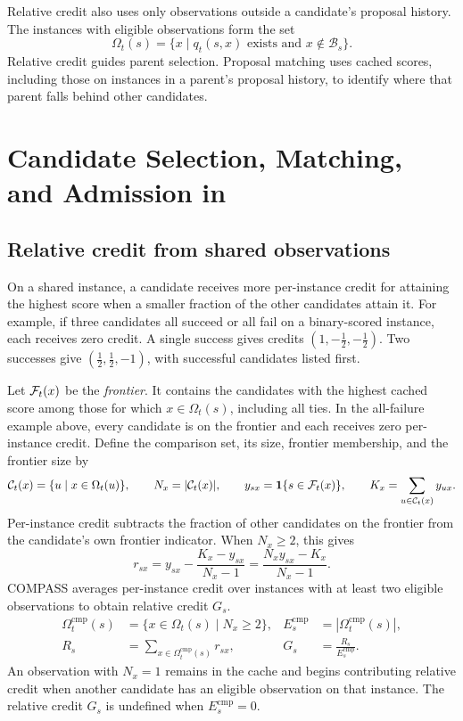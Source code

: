 Relative credit also uses only observations outside a candidate's proposal
history.  The instances with eligible observations form the set
\[
\Omega_t(s)=\{x\mid q_t(s,x)\text{ exists and }x\notin\mathcal B_s\}.
\]
Relative credit guides parent selection.  Proposal matching uses cached scores,
including those on instances in a parent's proposal history, to identify where
that parent falls behind other candidates.

\newpage
\section{Candidate Selection, Matching, and Admission in \method{}}
\label{sec:method}

\subsection{Relative credit from shared observations}
\label{sec:global_credit}

On a shared instance, a candidate receives more per-instance credit for attaining
the highest score when a smaller fraction of the other candidates attain it.
For example, if three candidates all succeed or all fail on a binary-scored
instance, each receives zero credit.  A single success gives credits
$(1,-\tfrac12,-\tfrac12)$. Two successes give
$(\tfrac12,\tfrac12,-1)$, with successful candidates listed first.

Let $\mathcal{F}_t(x)$ be the \emph{frontier}.  It contains the candidates with the
highest cached score among those for which $x\in\Omega_t(s)$, including all
ties.
In the all-failure example above, every candidate is on the frontier and each
receives zero per-instance credit.  Define the comparison set, its size,
frontier membership, and the frontier size by
\[
\mathcal C_t(x)=\{u\mid x\in\Omega_t(u)\},\qquad
N_x=|\mathcal C_t(x)|,\qquad
y_{sx}=\mathbf{1}\{s\in\mathcal{F}_t(x)\},\qquad
K_x=\sum_{u\in\mathcal C_t(x)}y_{ux}.
\]
Per-instance credit subtracts the fraction of other candidates on the frontier
from the candidate's own frontier indicator.  When $N_x\ge2$, this gives
\[
r_{sx}=y_{sx}-\frac{K_x-y_{sx}}{N_x-1}
=\frac{N_xy_{sx}-K_x}{N_x-1}.
\]
COMPASS averages per-instance credit over instances with at least two eligible
observations to obtain relative credit $G_s$.
\begin{equation}
\begin{aligned}
\Omega_t^{\mathrm{cmp}}(s)&=\{x\in\Omega_t(s)\mid N_x\ge2\},
&E_s^{\mathrm{cmp}}&=|\Omega_t^{\mathrm{cmp}}(s)|,\\
R_s&=\sum_{x\in\Omega_t^{\mathrm{cmp}}(s)}r_{sx},
&G_s&=\frac{R_s}{E_s^{\mathrm{cmp}}}.
\end{aligned}
\label{eq:global_key}
\end{equation}
An observation with $N_x=1$ remains in the cache and begins contributing relative
credit when another candidate has an eligible observation on that instance.
The relative credit $G_s$ is undefined when $E_s^{\mathrm{cmp}}=0$.

